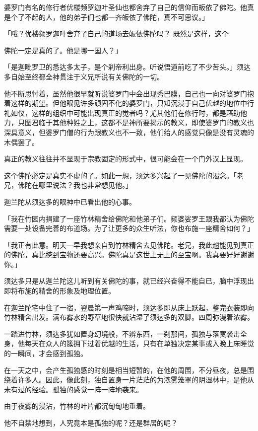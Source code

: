 \documentclass[twoside,openany]{book}
\begin{document}
婆罗门有名的修行者优楼频罗迦叶圣仙也都舍弃了自己的信仰而皈依了佛陀。他真是个了不起的人，他的弟子们也都一齐皈依了佛陀，真不可思议。」

「哦？优楼频罗迦叶舍弃了自己的道场去皈依佛陀吗？	既然是这样，这个





佛陀一定是真的了。他是哪一国人？」

「是迦毗罗卫的悉达多太子，是个刹帝利出身。听说悟道前吃了不少苦头。」须达多自始至终都全神贯注于义兄所说有关佛陀的一切。

他不断思忖着，虽然他很早就听说婆罗门中会出现秀巴膜，自己也一向对婆罗门抱着这样的期望。但他眼见许多顽固不化的婆罗门，只知沉浸于自己优越的地位中行礼如仪，这样的组织中可能出现真正的觉者吗？尤其他们在修行时，都是藉助他力，只图君临于其他种姓之上，这都不是神所要揭示的教义，即使婆罗门的教义也深具意义，但婆罗门僧的行为跟教义也不一致，他们给人的感觉只像是没有灵魂的木偶罢了。

真正的教义往往并不显现于宗教固定的形式中，很可能会在一个门外汉上显现。

这个佛陀必定是真实不虚的了。如此一想，须达多兴起了一见佛陀的渴念。「老兄，佛陀在哪里说法？我也非常想见他。」

迦兰陀从须达多的眼神中已看出他的心事。

「我在竹园内捐建了一座竹林精舍给佛陀和他弟子们。频婆娑罗王跟我都认为佛陀需要一处设备完善的布道场。为了让更多的众生听法，你也布施一座精舍如何？」

「我正有此意。明天一早我想亲自到竹林精舍去见佛陀。老兄，我此趟能见到真正的佛陀，真比挖到宝物还要高兴。佛陀真是这世上无上的至宝啊。我真要好好谢谢你。」

须达多只是从迦兰陀这儿听到有关佛陀的事，就已经兴奋得不能自已，脑中浮现出即将布施的精舍的形象及地理位置。

在迦兰陀宅中住了一宿，翌晨第一声鸡啼时，须达多即从床上跃起，整完衣装即向竹林精舍出发。满布雾水的野草地很快就沾湿了须达多的双脚。四周弥漫着浓雾。

一踏进竹林，须达多犹如置身幻境般，不辨东西，一刹那间，孤独与落寞袭击全身，他每天在众人的簇拥下过着优越的生活，只有在单独决定某事或入晚上床睡觉的一瞬间，才会感到孤独。

在一天之中，会产生孤独感的时刻是相当短暂的，在他的周围，不分昼夜，总是围绕着许多人。因此，像此刻，独自置身一片茫茫的为浓雾笼罩的阴湿林中，是他从未有过的经验。孤独的感觉一阵一阵地袭来。

由于夜雾的浸沾，竹林的叶片都沉甸甸地垂着。

他不自禁地想到，人究竟本是孤独的呢？还是群居的呢？
\end{document}
